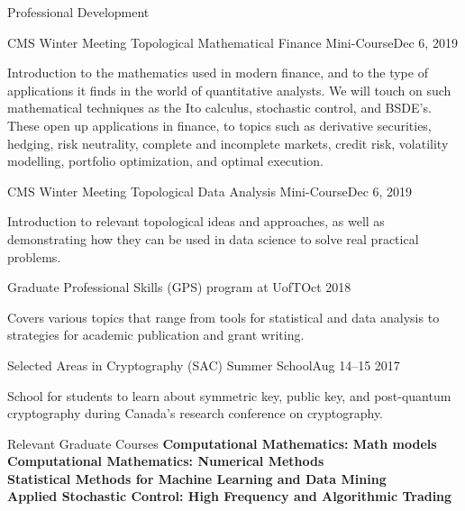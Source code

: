 \documentclass{resume}
\begin{document}
\begin{rSection}{Professional Development}
\begin{rSubsection}{CMS Winter Meeting Topological Mathematical Finance Mini-Course}{Dec 6, 2019}{}{}
\item  Introduction to the mathematics used in modern finance, and to the type of applications it finds in the world of quantitative analysts. We will touch on such mathematical techniques as the Ito calculus, stochastic control, and BSDE’s. These open up applications in finance, to topics such as derivative securities, hedging, risk neutrality, complete and incomplete markets, credit risk, volatility modelling, portfolio optimization, and optimal execution.
\end{rSubsection}

\begin{rSubsection}{CMS Winter Meeting Topological Data Analysis Mini-Course}{Dec 6, 2019}{}{}
\item Introduction to relevant topological ideas and approaches, as well as demonstrating how they can be used in data science to solve real practical problems.
\end{rSubsection}

\begin{rSubsection}{Graduate Professional Skills (GPS) program at UofT}{Oct 2018}{}{}
\item Covers various topics that range from tools for statistical and data analysis to strategies for academic publication and grant writing.
\end{rSubsection}

\begin{rSubsection}{Selected Areas in Cryptography (SAC) Summer School}{Aug 14--15 2017}{}{}
\item School for students to learn about symmetric key, public key, and post-quantum cryptography during Canada's research conference on cryptography.
\end{rSubsection}

\end{rSection}

\begin{rSection}{Relevant Graduate Courses}
\textbf{Computational Mathematics: Math models}\\
\textbf{Computational Mathematics: Numerical Methods }\\
 \textbf{Statistical Methods for Machine Learning and Data Mining}\\
 \textbf{Applied Stochastic Control: High Frequency and Algorithmic Trading}
\end{rSection}
\end{document}
